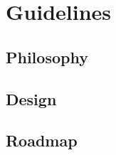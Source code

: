 \section{Guidelines}

\subsection{Philosophy} %





\subsection{Design} %





\subsection{Roadmap} %









